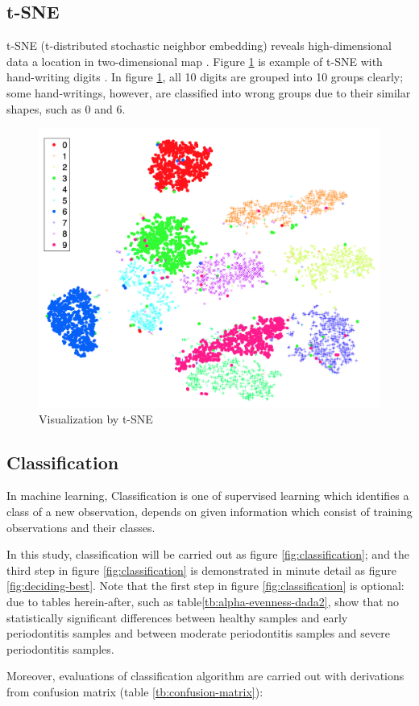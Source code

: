 \documentclass[a4paper]{article}
\begin{document}
        \subsection{t-SNE}
            t-SNE (t-distributed stochastic neighbor embedding) reveals high-dimensional data a location in two-dimensional map \cite{tSNE1}. Figure \ref{fig:tsne-example} is example of t-SNE with hand-writing digits \cite{tSNE1}. In figure \ref{fig:tsne-example}, all 10 digits are grouped into 10 groups clearly; some hand-writings, however, are classified into wrong groups due to their similar shapes, such as 0 and 6.

            \begin{figure}[p]
                \centering
                \includegraphics[width=0.4 \linewidth]{figures/tSNE.png}
                \caption{Visualization by t-SNE \protect\cite{tSNE1}}
                \label{fig:tsne-example}
            \end{figure}

        \subsection{Classification}
            In machine learning, Classification is one of supervised learning which identifies a class of a new observation, depends on given information which consist of training observations and their classes.

            In this study, classification will be carried out as figure \ref{fig:classification}; and the third step in figure \ref{fig:classification} is demonstrated in minute detail as figure \ref{fig:deciding-best}. Note that the first step in figure \ref{fig:classification} is optional: due to tables herein-after, such as table\ref{tb:alpha-evenness-dada2}, show that no statistically significant differences between healthy samples and early periodontitis samples and between moderate periodontitis samples and severe periodontitis samples.

            Moreover, evaluations of classification algorithm are carried out with derivations from confusion matrix (table \ref{tb:confusion-matrix}):
\end{document}
